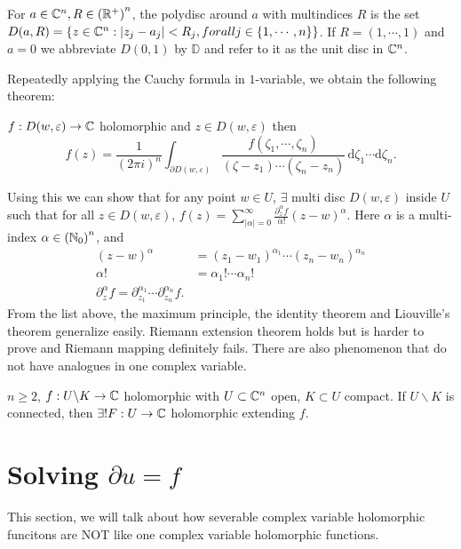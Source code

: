 \begin{definition}
  For $a\in \mathbb{C}^{n}, R\in \left( \mathbb{R}^{+} \right) ^{n}$, the polydisc around $a$ with multindices $R$ is the set $D(a,R)=\left\{z\in \mathbb{C}^{n}:|z_j-a_j|<R_j,\\forall j\in \left\{1,\cdots ,n\right\} \right\} $. If $R=(1,\cdots ,1)$ and $a=0$ we abbreviate $D(0,1)$ by $\mathbb{D}$ and refer to it as the unit disc in $\mathbb{C}^{n}$. 
\end{definition}
Repeatedly applying the Cauchy formula in $1$-variable, we obtain the following theorem:
\begin{theorem}
  $f:D(w,\varepsilon )\to \mathbb{C}$ holomorphic and $z\in D(w,\varepsilon )$ then 
  \[
    f(z)=\frac{1}{\left( 2\pi i \right) ^{n}}\int_{\partial D(w,\varepsilon )}\frac{f(\zeta_1,\cdots ,\zeta_n)}{(\zeta-z_1)\cdots (\zeta_n-z_n)}\,\mathrm{d}\zeta_1\cdots \mathrm{d}\zeta_n.
  \] 
\end{theorem}
Using this we can show that for any point $w\in U$, $\exists $ multi disc $D(w,\varepsilon )$ inside $U$ such that for all $z\in D(w,\varepsilon )$, $f(z)=\sum_{|\alpha|=0}^{\infty} \frac{\partial^{\alpha}_z f}{\alpha!}(z-w)^{\alpha}$. Here $\alpha$ is a multi-index $\alpha \in \left( \mathbb{N}_0 \right) ^{n}$, and 
\begin{align*}
  (z-w)^{\alpha}&= (z_1-w_1)^{\alpha_1}\cdots (z_n-w_n)^{\alpha_n} \\
  \alpha! &= \alpha_1!\cdots \alpha_n! \\
  \partial^{\alpha}_{z}f=\partial_{z_1}^{\alpha_1}\cdots \partial_{z_n}^{\alpha_n}f
.\end{align*}
From the list above, the maximum principle, the identity theorem and Liouville's theorem generalize easily.
Riemann extension theorem holds but is harder to prove and Riemann mapping definitely fails. There are also phenomenon that do not have analogues in one complex variable. 
\begin{theorem}
  $n\ge 2$, $f:U \backslash  K\to \mathbb{C}$ holomorphic with $U \subset  \mathbb{C}^{n}$ open, $K\subset U$ compact. If $U \backslash  K$ is connected, then $\exists ! F:U\to \mathbb{C}$ holomorphic extending $f$.
\end{theorem}

\section{Solving $\partial u = f$}
This section, we will talk about how severable complex variable holomorphic funcitons are NOT like one complex variable holomorphic functions.


